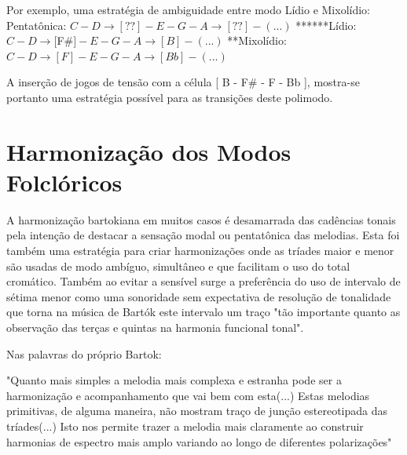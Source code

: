 \documentclass[
	12pt,				%
	openright,			%
	twoside,			%
	a4paper,			%
	english,			%
	french,				%
	spanish,			%
	brazil				%
	]{abntex2}
\begin{document}
Por exemplo, uma estratégia de ambiguidade entre modo Lídio e Mixolídio:
\linebreak
Pentatônica: $ C - D \rightarrow [ ?? ] - E - G - A \rightarrow [ ?? ] - (...) $  \linebreak
******Lídio: $ C - D \rightarrow [ $F\#$ ] - E - G - A \rightarrow [ B ] - (...) $  \linebreak
**Mixolídio: $ C - D \rightarrow [ F ] - E - G - A \rightarrow [ Bb ] - (...) $  \linebreak

A inserção de jogos de tensão com a célula [ B - F\# - F - Bb ], mostra-se portanto uma estratégia possível para as transições deste polimodo.








 

  



\section{Harmonização dos Modos Folclóricos}


A harmonização  bartokiana em muitos casos é desamarrada das cadências tonais pela intenção de destacar a sensação modal ou pentatônica das melodias. Esta foi também uma estratégia para criar harmonizações onde as tríades maior e menor são usadas de modo ambíguo, simultâneo e que facilitam o uso do total cromático. Também ao evitar a sensível surge a preferência do uso de intervalo de sétima menor como uma sonoridade sem expectativa de resolução de tonalidade que torna na música de Bartók este intervalo um traço "tão importante quanto as observação das terças e quintas na harmonia funcional tonal"\cite[p. 28]{antokoletz1984music}.

Nas palavras do próprio Bartok:

\begin{citacao}
"Quanto mais simples a melodia mais complexa e estranha pode ser a harmonização e acompanhamento que vai bem com esta(...) Estas melodias primitivas, de alguma maneira, não mostram traço de junção estereotipada das tríades(...) Isto nos permite trazer a melodia mais claramente ao construir harmonias de espectro mais amplo variando ao longo de diferentes polarizações"
\cite[p. 342]{bartok1993bela}
\end{citacao}
\end{document}
